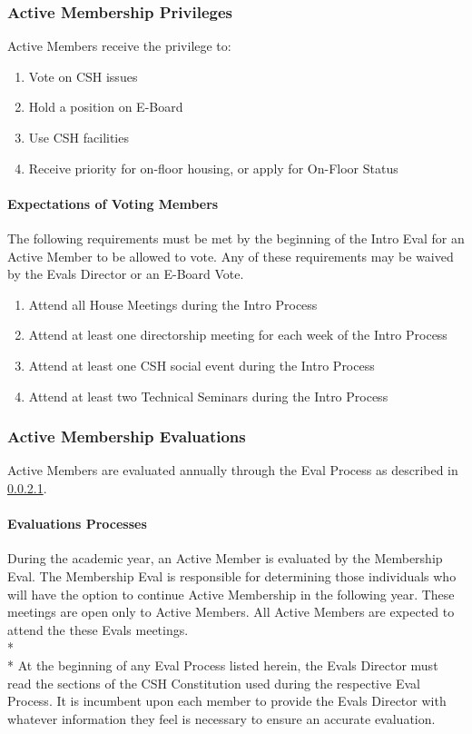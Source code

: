 \documentclass{article}
\newcommand{\asubsection}[1]{\subsubsection{#1} \label{#1}}
\newcommand{\asubsubsection}[1]{\paragraph{#1} \label{#1}}
\begin{document}
\asubsection{Active Membership Privileges}
Active Members receive the privilege to:
\begin{enumerate}
	\item Vote on CSH issues
	\item Hold a position on E-Board
	\item Use CSH facilities
	\item Receive priority for on-floor housing, or apply for On-Floor Status
\end{enumerate}

\asubsubsection{Expectations of Voting Members}
\renewcommand{\theenumi}{\arabic{enumi}} %

The following requirements must be met by the beginning of the Intro Eval for an Active Member to be allowed to vote.
Any of these requirements may be waived by the Evals Director or an E-Board Vote.
\begin{enumerate}
	\item Attend all House Meetings during the Intro Process
	\item Attend at least one directorship meeting for each week of the Intro Process %
	\item Attend at least one CSH social event during the Intro Process
	\item Attend at least two Technical Seminars during the Intro Process
\end{enumerate}

\asubsection{Active Membership Evaluations}
Active Members are evaluated annually through the Eval Process as described in \ref{Evaluations Processes}.

\asubsubsection{Evaluations Processes}
During the academic year, an Active Member is evaluated by the Membership Eval.
The Membership Eval is responsible for determining those individuals who will have the option to continue Active Membership in the following year.
These meetings are open only to Active Members.
All Active Members are expected to attend the these Evals meetings.
\\* \\*
At the beginning of any Eval Process listed herein, the Evals Director must read the sections of the CSH Constitution used during the respective Eval Process.
It is incumbent upon each member to provide the Evals Director with whatever information they feel is necessary to ensure an accurate evaluation.
\end{document}

